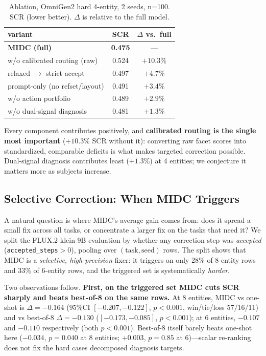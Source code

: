 \documentclass[letterpaper]{article}
\begin{document}
\begin{table}[t]
\centering
\small
\begin{tabular}{lcc}
\toprule
variant & SCR & $\Delta$ vs.\ full \\
\midrule
\textbf{MIDC (full)} & \textbf{0.475} & --- \\
w/o calibrated routing (raw) & 0.524 & $+10.3\%$ \\
relaxed $\rightarrow$ strict accept & 0.497 & $+4.7\%$ \\
prompt-only (no refset/layout) & 0.491 & $+3.4\%$ \\
w/o action portfolio & 0.489 & $+2.9\%$ \\
w/o dual-signal diagnosis & 0.481 & $+1.3\%$ \\
\bottomrule
\end{tabular}
\caption{Ablation, OmniGen2 hard 4-entity, 2 seeds, n=100. SCR (lower better). $\Delta$ is relative to the full model.}
\label{tab:ablation}
\end{table}

Every component contributes positively, and \textbf{calibrated routing is the single most important} ($+10.3\%$ SCR without it): converting raw facet scores into standardized, comparable deficits is what makes targeted correction possible. Dual-signal diagnosis contributes least ($+1.3\%$) at 4 entities; we conjecture it matters more as subjects increase.

\subsection{Selective Correction: When MIDC Triggers}
\label{sec:gating}

A natural question is where MIDC's average gain comes from: does it spread a small fix across all tasks, or concentrate a larger fix on the tasks that need it? We split the FLUX.2-klein-9B evaluation by whether any correction step was \emph{accepted} (\texttt{accepted\_steps}$>0$), pooling over $(\text{task}, \text{seed})$ rows. The split shows that MIDC is a \emph{selective, high-precision} fixer: it triggers on only $28\%$ of 8-entity rows and $33\%$ of 6-entity rows, and the triggered set is systematically \emph{harder}.

Two observations follow. \textbf{First, on the triggered set MIDC cuts SCR sharply and beats best-of-8 on the same rows.} At 8 entities, MIDC vs one-shot is $\Delta{=}{-}0.164$ ($95\%$CI $[-0.207,-0.122]$, $p{<}0.001$, win/tie/loss $57/16/11$) and vs best-of-8 $\Delta{=}{-}0.130$ ($[-0.173,-0.085]$, $p{<}0.001$); at 6 entities, $-0.107$ and $-0.110$ respectively (both $p{<}0.001$). Best-of-8 itself barely beats one-shot here ($-0.034$, $p{=}0.040$ at 8 entities; $+0.003$, $p{=}0.85$ at 6)---scalar re-ranking does not fix the hard cases decomposed diagnosis targets.
\end{document}
